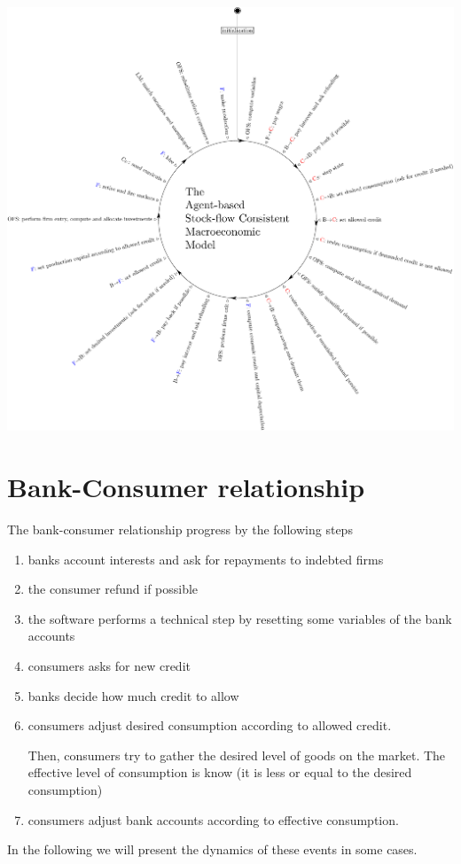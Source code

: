 \documentclass{article}
\begin{document}
\includegraphics[scale=0.5]{visual.pdf}

\section{Bank-Consumer relationship}
The bank-consumer relationship progress by the following steps

\begin{enumerate}
	\item banks account interests and ask for repayments to indebted firms
	\item the consumer refund if possible
	\item the software performs a technical step by resetting some variables of the bank accounts
	\item consumers asks for new credit
	\item banks decide how much credit to allow
	\item consumers adjust desired consumption according to allowed credit. 
		
		Then, consumers try to gather the desired level of goods on the market. The effective level of consumption is know (it is less or equal to the desired consumption)
	\item consumers adjust bank accounts according to effective consumption.
\end{enumerate}
In the following we will present the dynamics of these events in some cases.
\end{document}
